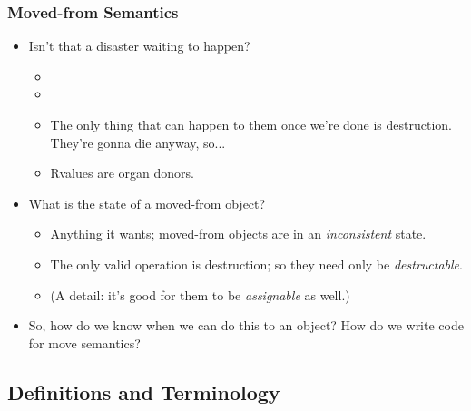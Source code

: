 \begin{frame}[fragile]
\frametitle{Moved-from Semantics}

\begin{itemize}[<+->]
\item Isn't that a disaster waiting to happen?

    \begin{itemize}
    \item {}
    \item {}
    \item The only thing that can happen to them
    once we're done is destruction. They're gonna die anyway, so...
    \item Rvalues are organ donors. 
    \end{itemize}

\vskip 6pt

\item  What is the state of a moved-from object?

    \begin{itemize}
    \item Anything it wants; moved-from objects are in an \emph{inconsistent} state.
    \item The only valid operation is destruction; so they need only be \emph{destructable}.
    \item (A detail: it's good for them to be \emph{assignable} as well.)
    \end{itemize}

\vskip 6pt

\item So, how do we know when we can do this to an object?  How do we
    write code for move semantics?

\end{itemize}
\end{frame}



\subsection[Definitions]{Definitions and Terminology}\lyxframeend{}

